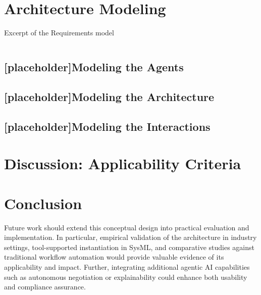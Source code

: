 \section{Architecture Modeling}\label{sec:mod-mas}
\begin{listing}[h]
    \caption{Excerpt of the Requirements model}
    \inputminted[firstline=1,lastline=25]{text}{ressources/models/requirements.sysml}
\end{listing}
\subsection{[placeholder]Modeling the Agents}\label{subsec:mod-agents}
\subsection{[placeholder]Modeling the Architecture}\label{subsec:mod-arch}
\subsection{[placeholder]Modeling the Interactions}\label{subsec:mod-interactions}

\section{Discussion: Applicability Criteria}\label{sec:discussion}
    
\section{Conclusion}\label{sec:conclussion}
Future work should extend this conceptual design into practical evaluation and implementation. In particular, empirical validation of the architecture in industry settings, tool-supported instantiation in SysML, and comparative studies against traditional workflow automation would provide valuable evidence of its applicability and impact. Further, integrating additional agentic AI capabilities such as autonomous negotiation or explainability could enhance both usability and compliance assurance.
\clearpage